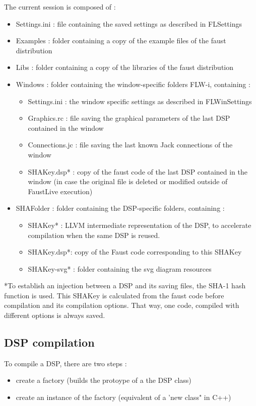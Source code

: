 \documentclass[a4paper]{article}
\begin{document}
The current session is composed of : 
\begin{itemize}
\item Settings.ini : file containing the saved settings as described in FLSettings
\item Examples : folder containing a copy of the example files of the faust distribution
\item Libs : folder containing a copy of the libraries of the faust distribution
\item Windows : folder containing the window-specific folders FLW-i, containing :
	\begin{itemize}
		\item Settings.ini : the window specific settings as described in FLWinSettings
		\item Graphics.rc : file saving the graphical parameters of the last DSP contained in the window
		\item Connections.jc : file saving the last known Jack connections of the window
		\item SHAKey.dsp* : copy of the faust code of the last DSP contained in the window (in case the original file is deleted or modified outside of FaustLive execution)
	\end{itemize}
\item SHAFolder : folder containing the DSP-specific folders, containing : 
	\begin{itemize}
		\item SHAKey* : LLVM intermediate representation of the DSP, to accelerate compilation when the same DSP is reused.
		\item SHAKey.dsp*: copy of the Faust code corresponding to this SHAKey
		\item SHAKey-svg* : folder containing the svg diagram resources
	\end{itemize}
\end{itemize}

*To establish an injection between a DSP and its saving files, the SHA-1 hash function is used. This SHAKey is calculated from the faust code before compilation and its compilation options. That way, one code, compiled with different options is always saved. 

\subsection{DSP compilation}

To compile a DSP, there are two steps :
\begin{itemize}
\item create a factory (builds the protoype of a the DSP class)
\item create an instance of the factory (equivalent of a 'new class" in C++)
\end{itemize}
\end{document}
